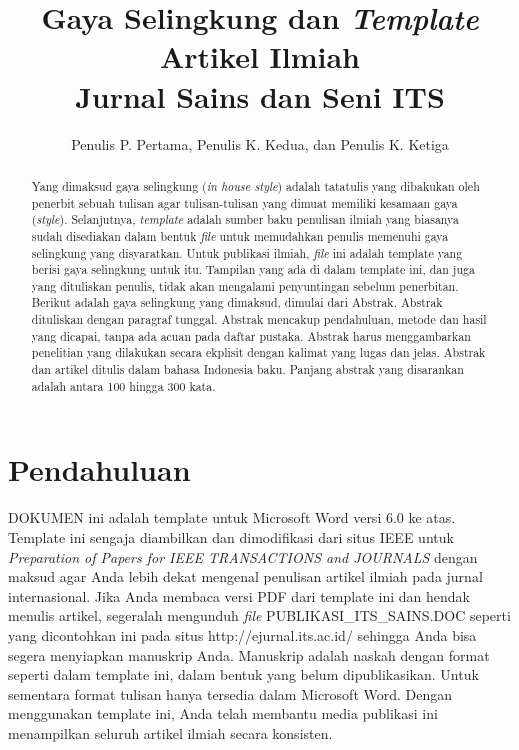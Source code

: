 \documentclass{its-jurnal}
\title{Gaya Selingkung dan \textit{Template} Artikel Ilmiah\\Jurnal Sains dan Seni ITS}
\author{Penulis P. Pertama, Penulis K. Kedua, dan Penulis K. Ketiga}
\affiliation{Afiliasi Penulis}
\begin{document}
\maketitle

\begin{abstract}
Yang dimaksud gaya selingkung (\textit{in house style}) adalah tatatulis yang dibakukan oleh penerbit sebuah tulisan agar tulisan-tulisan yang dimuat memiliki kesamaan gaya (\textit{style}). Selanjutnya, \textit{template} adalah sumber baku penulisan ilmiah yang biasanya sudah disediakan dalam bentuk \textit{file} untuk memudahkan penulis memenuhi gaya selingkung yang disyaratkan. Untuk publikasi ilmiah, \textit{file} ini adalah template yang berisi gaya selingkung untuk itu. Tampilan yang ada di dalam template ini, dan juga yang dituliskan penulis, tidak akan mengalami penyuntingan sebelum penerbitan. Berikut adalah gaya selingkung yang dimaksud, dimulai dari Abstrak. Abstrak dituliskan dengan paragraf tunggal. Abstrak mencakup pendahuluan, metode dan hasil yang dicapai, tanpa ada acuan pada daftar pustaka. Abstrak harus menggambarkan penelitian yang dilakukan secara ekplisit dengan kalimat yang lugas dan jelas. Abstrak dan artikel ditulis dalam bahasa Indonesia baku. Panjang abstrak yang disarankan adalah antara 100 hingga 300 kata.
\end{abstract}


\section{Pendahuluan}
\lettrine{D}{OKUMEN} ini adalah template untuk Microsoft Word versi 6.0 ke atas. Template ini sengaja diambilkan dan dimodifikasi dari situs IEEE untuk \textit{Preparation of Papers for IEEE TRANSACTIONS and JOURNALS} dengan maksud agar Anda lebih dekat mengenal penulisan artikel ilmiah pada jurnal internasional. Jika Anda membaca versi PDF dari template ini dan hendak menulis artikel, segeralah mengunduh \textit{file} PUBLIKASI\_ITS\_SAINS.DOC seperti yang dicontohkan ini pada situs http://ejurnal.its.ac.id/ sehingga Anda bisa segera menyiapkan manuskrip Anda. Manuskrip adalah naskah dengan format seperti dalam template ini, dalam bentuk yang belum dipublikasikan. Untuk sementara format tulisan hanya tersedia dalam Microsoft Word. Dengan menggunakan template ini, Anda telah membantu media publikasi ini menampilkan seluruh artikel ilmiah secara konsisten.
\end{document}
